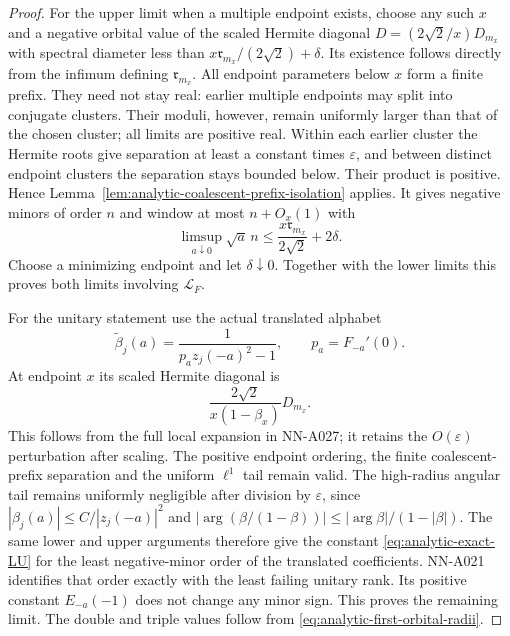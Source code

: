 \begin{proof}
For the upper limit when a multiple endpoint exists, choose any such
$x$ and a negative orbital value of the scaled Hermite diagonal
$D=(2\sqrt2/x)D_{m_x}$ with spectral diameter less than
$x\mathfrak r_{m_x}/(2\sqrt2)+\delta$.
Its existence follows directly from the infimum defining
$\mathfrak r_{m_x}$. All endpoint parameters below $x$ form a finite
prefix. They need not stay real: earlier multiple endpoints may split
into conjugate clusters. Their moduli, however, remain uniformly
larger than that of the chosen cluster; all limits are positive real.
Within each earlier cluster the Hermite roots give separation at least
a constant times $\varepsilon$, and between distinct endpoint clusters
the separation stays bounded below. Their product is positive.
Hence Lemma~\ref{lem:analytic-coalescent-prefix-isolation} applies.
It gives negative minors of order $n$ and window at most $n+O_x(1)$
with
\[
 \limsup_{a\downarrow0}\sqrt a\,n
                    \le\frac{x\mathfrak r_{m_x}}{2\sqrt2}+2\delta.
\]
Choose a minimizing endpoint and let $\delta\downarrow0$. Together
with the lower limits this proves both limits involving $\mathcal L_F$.

For the unitary statement use the actual translated alphabet
\[
                \widetilde\beta_j(a)=\frac1{p_a z_j(-a)^2-1},
                                \qquad p_a=F_{-a}'(0).
\]
At endpoint $x$ its scaled Hermite diagonal is
\[
                    \frac{2\sqrt2}{x(1-\beta_x)}D_{m_x}.
\]
This follows from the full local expansion in NN-A027; it retains the
$O(\varepsilon)$ perturbation after scaling. The positive endpoint
ordering, the finite coalescent-prefix separation and the uniform
$\ell^1$ tail remain valid. The high-radius angular tail remains
uniformly negligible after division by $\varepsilon$, since
$|\beta_j(a)|\le C/|z_j(-a)|^2$ and
$|\arg(\beta/(1-\beta))|\le|\arg\beta|/(1-|\beta|)$.
The same lower and upper arguments therefore give the constant
\eqref{eq:analytic-exact-LU} for the least negative-minor order of
the translated coefficients. NN-A021 identifies that order exactly
with the least failing unitary rank. Its positive constant
$E_{-a}(-1)$ does not change any minor sign. This proves the remaining
limit. The double and triple values follow from
\eqref{eq:analytic-first-orbital-radii}.
\end{proof}


